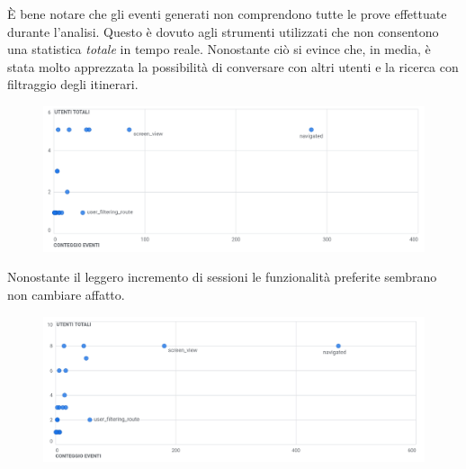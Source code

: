 \documentclass{natourDoc}
\begin{document}
È bene notare che gli eventi generati non comprendono tutte le prove effettuate durante l'analisi.
Questo è dovuto agli strumenti utilizzati che non consentono una statistica \textit{totale} in tempo reale.
Nonostante ciò si evince che, in media, è stata molto apprezzata la possibilità di conversare con altri utenti
e la ricerca con filtraggio degli itinerari.

\begin{figure}[!htbp]
	\centering
	\includegraphics[width=\textwidth]{./analytics/utenti-eventi-grafico.png}
\end{figure}
\FloatBarrier

\newpage

Nonostante il leggero incremento di sessioni le funzionalità preferite sembrano
non cambiare affatto.
\begin{figure}[!htbp]
	\centering
	\includegraphics[width=\textwidth]{./analytics/utenti-eventi-grafico2.png}
\end{figure}
\FloatBarrier
\end{document}
